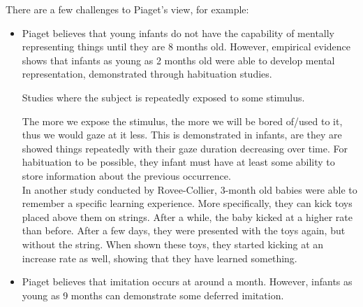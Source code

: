 \documentclass[../main/main.tex]{subfiles}
\begin{document}
There are a few challenges to Piaget's view, for example:
\begin{itemize}
\item Piaget believes that young infants do not have the capability of mentally representing things until they are 8 months old. However, empirical evidence shows that infants as young as 2 months old were able to develop mental representation, demonstrated through habituation studies.
        \begin{definition}
 Studies where the subject is repeatedly exposed to some stimulus.
        \end{definition}
        The more we expose the stimulus, the more we will be bored of/used to it, thus we would gaze at it less. This is demonstrated in infants, are they are showed things repeatedly with their gaze duration decreasing over time. For habituation to be possible, they infant must have at least some ability to store information about the previous occurrence.\\

        In another study conducted by Rovee-Collier, 3-month old babies were able to remember a specific learning experience. More specifically, they can kick toys placed above them on strings. After a while, the baby kicked at a higher rate than before. After a few days, they were presented with the toys again, but without the string. When shown these toys, they started kicking at an increase rate as well, showing that they have learned something.
\item Piaget believes that imitation occurs at around a month. However, infants as young as 9 months can demonstrate some deferred imitation.
\end{itemize}
\end{document}
